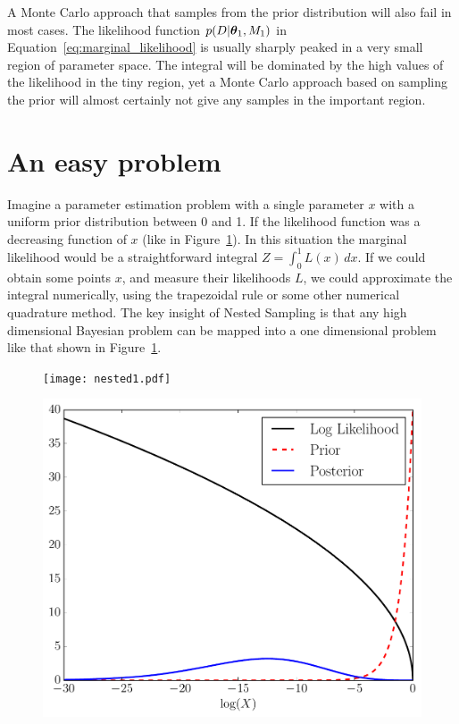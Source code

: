 A Monte Carlo approach that samples from the prior distribution will also fail
in most cases. The likelihood function $p(D | \boldsymbol{\theta}_1, M_1)$ in
Equation~\ref{eq:marginal_likelihood} is usually sharply peaked in a very
small region of parameter space. The integral will be dominated by the high values
of the likelihood in the tiny region, yet a Monte Carlo approach based on
sampling the prior will almost certainly not give any samples in the important
region.

\section{An easy problem}
Imagine a parameter estimation problem with a single parameter $x$ with a
uniform prior distribution between 0 and 1. If the likelihood function was a
decreasing function of $x$ (like in Figure~\ref{fig:nested1}). In this
situation the marginal likelihood would be a straightforward integral
$Z = \int_0^1 L(x) \,dx$. If we could obtain some points $x$, and measure their
likelihoods $L$, we could approximate the integral numerically, using the
trapezoidal rule or some other numerical quadrature method.
The key insight of Nested Sampling is that any high dimensional Bayesian
problem can be mapped into a one dimensional problem like that shown in
Figure~\ref{fig:nested1}.

\begin{figure}
\begin{center}
\texttt{[image: nested1.pdf]}
\caption{\label{fig:nested1}}
\end{center}
\end{figure}



\begin{figure}
\begin{center}
\includegraphics[scale=0.5]{nested2.pdf}
\caption{\label{fig:nested2}}
\end{center}
\end{figure}


